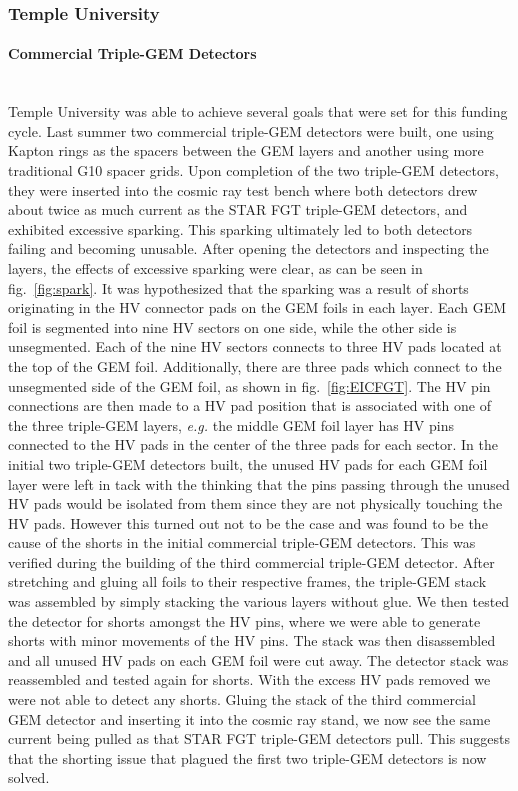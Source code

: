 \subsubsection{Temple University} 
\paragraph*{Commercial Triple-GEM Detectors}\mbox{}\\
Temple University was able to achieve several goals that were set for this funding cycle. 
Last summer two commercial triple-GEM detectors were built, one using Kapton rings as the spacers between the GEM layers and another using more traditional G10 spacer grids. Upon completion of the two triple-GEM detectors, they were inserted into the cosmic ray test bench where both detectors drew about twice as much current as the STAR FGT triple-GEM detectors, and exhibited excessive sparking. This sparking ultimately led to both detectors failing and becoming unusable. After opening the detectors and inspecting the layers, the effects of excessive sparking were clear, as can be seen in fig.~\ref{fig:spark}. It was hypothesized that the sparking was a result of shorts originating in the HV connector pads on the GEM foils in each layer. Each GEM foil is segmented into nine HV sectors on one side, while the other side is unsegmented. Each of the nine HV sectors connects to three HV pads located at the top of the GEM foil. Additionally, there are three pads which connect to the unsegmented side of the GEM foil, as shown in fig.~\ref{fig:EICFGT}. The HV pin connections are then made to a HV pad position that is associated with one of the three triple-GEM layers, \emph{e.g.} the middle GEM foil layer has HV pins connected to the HV pads in the center of the three pads for each sector. In the initial two triple-GEM detectors built, the unused HV pads for each GEM foil layer were left in tack with the thinking that the pins passing through the unused HV pads would be isolated from them since they are not physically touching the HV pads. However this turned out not to be the case and was found to be the cause of the shorts in the initial commercial triple-GEM detectors. This was verified during the building of the third commercial triple-GEM detector. After stretching and gluing all foils to their respective frames, the triple-GEM stack was assembled by simply stacking the various layers without glue. We then tested the detector for shorts amongst the HV pins, where we were able to generate shorts with minor movements of the HV pins. The stack was then disassembled and all unused HV pads on each GEM foil were cut away. The detector stack was reassembled and tested again for shorts. With the excess HV pads removed we were not able to detect any shorts. Gluing the stack of the third commercial GEM detector and inserting it into the cosmic ray stand, we now see the same current being pulled as that STAR FGT triple-GEM detectors pull. This suggests that the shorting issue that plagued the first two triple-GEM detectors is now solved.      

